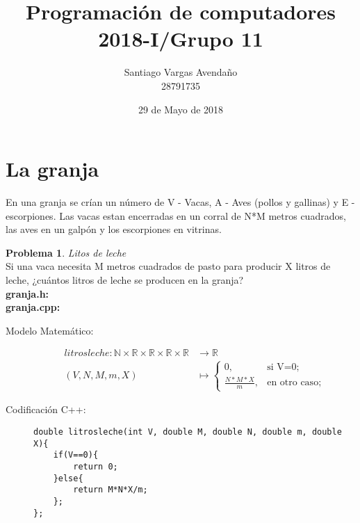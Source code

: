 \documentclass{article}
\title{Programación de computadores 2018-I/Grupo 11}
\author{Santiago Vargas Avendaño\\28791735}
\date{29 de Mayo de 2018}
\theoremstyle{plain}
\theoremstyle{definition}
\newtheorem{problem}{Problema}
\begin{document}
\maketitle

\section{La granja}
\begin{description}
En una granja se crían un número de V - Vacas, A - Aves (pollos y gallinas) y E - escorpiones. Las vacas estan encerradas en un corral de N*M metros cuadrados, las aves en un galpón y los escorpiones en vitrinas.
\end{description}
\begin{problem} \emph{Litos de leche}\\
Si una vaca necesita M metros cuadrados de pasto para producir X litros de leche, ¿cuántos litros de leche se producen en la granja?\\
\textbf{granja.h:}\ \\
\textbf{granja.cpp:}\ 
%
\begin{description}
\item[Modelo Matemático:]
%
\begin{align*}
litrosleche: \mathbb{N}\times\mathbb{R}\times\mathbb{R}\times\mathbb{R}\times\mathbb{R} &\to \mathbb{R}\\
(V,N,M,m,X) &\mapsto
\begin{cases}
0,& \text{si V=0;}\\
\frac{N*M*X}{m},& \text{en otro caso;}
\end{cases}
\end{align*}
%
\item[Codificación \textsf{C++}:]\hfill
%
\begin{verbatim}
double litrosleche(int V, double M, double N, double m, double X){
    if(V==0){
        return 0;
    }else{
        return M*N*X/m;
    };
};
\end{verbatim}
\end{description}
\end{problem}
\end{document}
